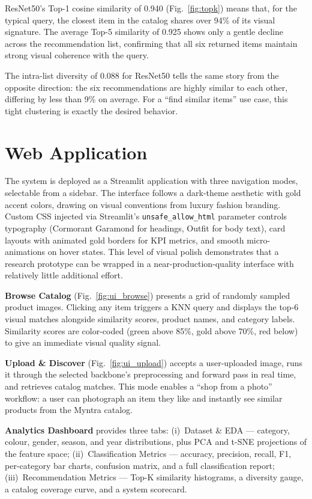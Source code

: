 \documentclass[conference]{IEEEtran}
\begin{document}
ResNet50's Top-1 cosine similarity of 0.940 (Fig.~\ref{fig:topk})
means that, for the typical query, the closest item in the catalog
shares over 94\% of its visual signature. The average Top-5 similarity
of 0.925 shows only a gentle decline across the recommendation list,
confirming that all six returned items maintain strong visual coherence
with the query.

The intra-list diversity of 0.088 for ResNet50 tells the same story
from the opposite direction: the six recommendations are highly
similar to each other, differing by less than 9\% on average.
For a ``find similar items'' use case, this tight clustering is
exactly the desired behavior.


\section{Web Application}
\label{sec:app}

The system is deployed as a Streamlit \cite{streamlit2024} application
with three navigation modes, selectable from a sidebar. The interface
follows a dark-theme aesthetic with gold accent colors, drawing on
visual conventions from luxury fashion branding. Custom CSS injected
via Streamlit's \texttt{unsafe\_allow\_html} parameter controls
typography (Cormorant Garamond for headings, Outfit for body text),
card layouts with animated gold borders for KPI metrics, and smooth
micro-animations on hover states. This level of visual polish
demonstrates that a research prototype can be wrapped in a
near-production-quality interface with relatively little additional
effort.

\textbf{Browse Catalog} (Fig.~\ref{fig:ui_browse}) presents a grid of
randomly sampled product images. Clicking any item triggers a KNN query
and displays the top-6 visual matches alongside similarity scores,
product names, and category labels. Similarity scores are color-coded
(green above 85\%, gold above 70\%, red below) to give an immediate
visual quality signal.

\textbf{Upload \& Discover} (Fig.~\ref{fig:ui_upload}) accepts a
user-uploaded image, runs it through the selected backbone's
preprocessing and forward pass in real time, and retrieves catalog
matches. This mode enables a ``shop from a photo'' workflow: a user
can photograph an item they like and instantly see similar products
from the Myntra catalog.

\textbf{Analytics Dashboard} provides three tabs: (i)~Dataset \& EDA
--- category, colour, gender, season, and year distributions, plus
PCA and t-SNE projections of the feature space; (ii)~Classification
Metrics --- accuracy, precision, recall, F1, per-category bar charts,
confusion matrix, and a full classification report; (iii)~Recommendation
Metrics --- Top-K similarity histograms, a diversity gauge, a catalog
coverage curve, and a system scorecard.
\end{document}
